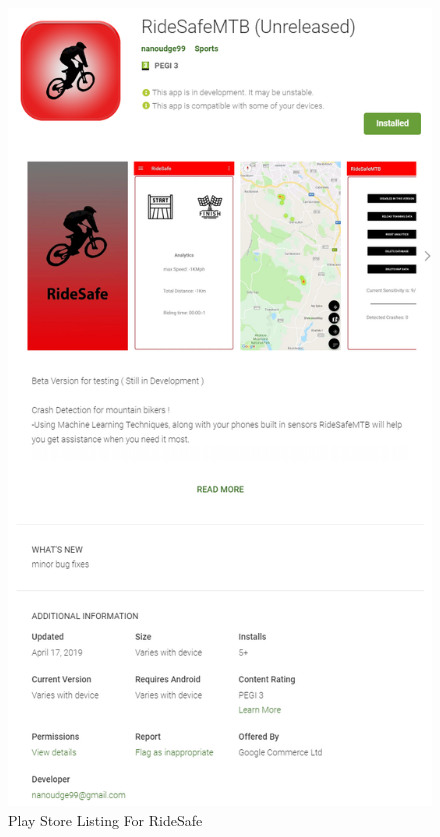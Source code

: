 \begin{figure}[h]
      \centering
      \includegraphics[scale = 1.3]{conclusion/Capture.png}
      \caption{Play Store Listing For RideSafe}
      \label{store}
\end{figure}
